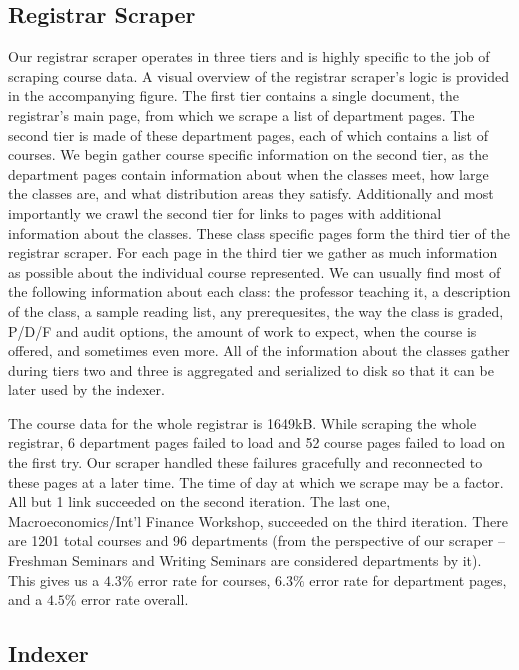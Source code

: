 \documentclass[12pt,letterpaper]{article}
\begin{document}
\subsection{Registrar Scraper}

Our registrar scraper operates in three tiers and is highly specific to the job of scraping course data. A visual overview of the registrar scraper's logic is provided in the accompanying figure. The first tier contains a single document, the registrar's main page, from which we scrape a list of department pages. The second tier is made of these department pages, each of which contains a list of courses. We begin gather course specific information on the second tier, as the department pages contain information about when the classes meet, how large the classes are, and what distribution areas they satisfy. Additionally and most importantly we crawl the second tier for links to pages with additional information about the classes. These class specific pages form the third tier of the registrar scraper. For each page in the third tier we gather as much information as possible about the individual course represented. We can usually find most of the following information about each class: the professor teaching it, a description of the class, a sample reading list, any prerequesites, the way the class is graded, P/D/F and audit options, the amount of work to expect, when the course is offered, and sometimes even more. All of the information about the classes gather during tiers two and three is aggregated and serialized to disk so that it can be later used by the indexer.

The course data for the whole registrar is 1649kB. While scraping the whole registrar, 6 department pages failed to load and 52 course pages failed to load on the first try. Our scraper handled these failures gracefully and reconnected to these pages at a later time. The time of day at which we scrape may be a factor. All but 1 link succeeded on the second iteration. The last one, Macroeconomics/Int'l Finance Workshop, succeeded on the third iteration. There are 1201 total courses and 96 departments (from the perspective of our scraper -- Freshman Seminars and Writing Seminars are considered departments by it). This gives us a $4.3\%$ error rate for courses, $6.3\%$ error rate for department pages, and a $4.5\%$ error rate overall. 

\subsection{Indexer}
	
\end{document}
